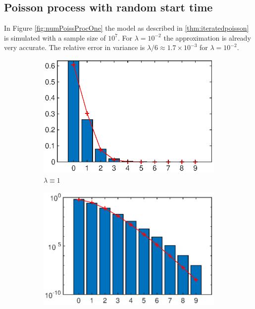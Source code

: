\documentclass{amsart}
\numberwithin{equation}{section}
\begin{document}
\subsection{Poisson process with random start time}
\label{sec:numPoissProcOne}
In Figure \ref{fig:numPoissProcOne} the model as described in \autoref{thm:iteratedpoisson} is simulated with a sample size of $10^7$. For $\lambda = 10^{-2}$ the approximation is already very accurate. The relative error in variance is $\lambda/6 \approx 1.7 \times 10^{-3}$ for $\lambda = 10^{-2}$.
\begin{figure}[ht]
    \centering
    \begin{subfigure}[t]{0.475\textwidth}
        \centering
        \includegraphics[width=\textwidth]{poissproc01_0_1.eps}
        \caption{$\lambda \equiv 1$}
    \end{subfigure}
    \hfill
    \begin{subfigure}[t]{0.475\textwidth}
        \centering
        \includegraphics[width=\textwidth]{poissproc01_0_2.eps}

\end{subfigure}
\end{figure}
\end{document}
